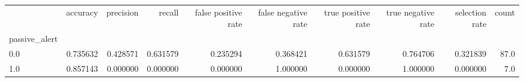 \begin{tabular}{lrrrrrrrrr}
\toprule
{} &  accuracy &  precision &    recall &  false positive rate &  false negative rate &  true positive rate &  true negative rate &  selection rate &  count \\
passive\_alert &           &            &           &                      &                      &                     &                     &                 &        \\
\midrule
0.0           &  0.735632 &   0.428571 &  0.631579 &             0.235294 &             0.368421 &            0.631579 &            0.764706 &        0.321839 &   87.0 \\
1.0           &  0.857143 &   0.000000 &  0.000000 &             0.000000 &             1.000000 &            0.000000 &            1.000000 &        0.000000 &    7.0 \\
\bottomrule
\end{tabular}
